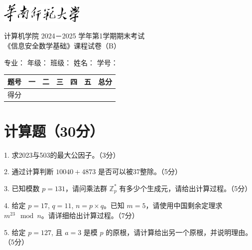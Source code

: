 \documentclass[12pt,a4paper]{article}
\begin{document}
\begin{center}
	\includegraphics[width=4cm]{./cover/title.pdf}
\end{center}
\begin{center}
    计算机学院 2024－2025 学年第1学期期末考试\\[5pt]
    《信息安全数学基础》课程试卷（B）
\end{center}

\begin{center}
\begin{flushleft}
    专业：\underline{\hspace{2cm}}
    年级：\underline{\hspace{1.5cm}}
    班级：\underline{\hspace{1.5cm}}
    姓名：\underline{\hspace{1.5cm}}
    学号：\underline{\hspace{2.5cm}}
\end{flushleft}
\end{center}
\begin{center}
\begin{tabular}{|c|c|c|c|c|c|c|}
    \hline
    题号 & 一 & 二 & 三 & 四 & 五 & 总分 \\
    \hline
    得分 & & & & & & \\
    \hline
\end{tabular}
\end{center}

\vspace{10pt}

\section{计算题（30分）}

1. 求2023与503的最大公因子。（3分）

2. 通过计算判断 $10040 + 4873$ 是否可以被37整除。（5分）

3. 已知模数 $p=131$，请问乘法群 $\mathbb{Z}_p^*$ 有多少个生成元，请给出计算过程。（5分）

4. 给定 $p=17$, $q=11$, $n=p \times q$。已知 $m=5$，请使用中国剩余定理求 $m^{23} \mod n$。请详细给出计算过程。（7分）

5. 给定 $p=127$, 且 $a=3$ 是模 $p$ 的原根，请计算给出另一个原根，并说明理由。（5分）
\end{document}

